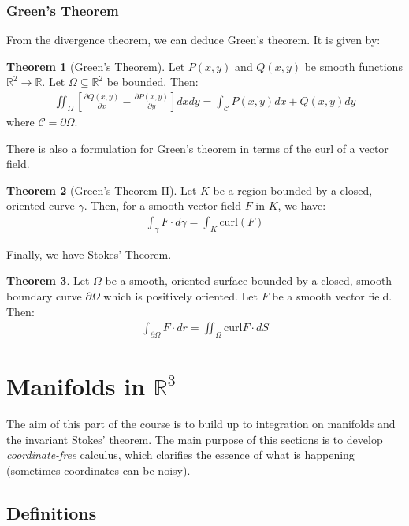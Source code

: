\documentclass[11pt]{scrartcl}
\newcommand{\R}[0]{\mathbb{R}}
\theoremstyle{definition}
\newtheorem{theorem}{Theorem}
\theoremstyle{remark}
\newcommand{\idx}[2]{\int_{#1}^{#2}}
\begin{document}
{\subsubsection{Green's Theorem}
From the divergence theorem, we can deduce Green's theorem. It is given by: 
\begin{theorem}[Green's Theorem]
	Let $P(x,y)$ and $Q(x,y)$ be smooth functions $\R^2 \rightarrow \R$. Let $\Omega \subseteq \R^2$ be bounded. Then: 
	\begin{align}
		\iint_\Omega \left[ 	\frac{\partial Q(x,y)}{\partial x} - \frac{\partial P(x,y)}{\partial y}	\right] dx dy = \idx{\mathcal{C}}{} P(x,y)dx + Q(x,y)dy	
	\end{align}
	where $\mathcal{C} = \partial \Omega$. 
\end{theorem}

There is also a formulation for Green's theorem in terms of the curl of a vector field. 

\begin{theorem}[Green's Theorem II]
	Let $K$ be a region bounded by a closed, oriented curve $\gamma$. Then, for a smooth vector field $F$ in $K$, we have: 
	\begin{align}
		\idx{\gamma}{} F \cdot d \gamma = \idx{K}{} \text{curl}(F) 	
	\end{align}
\end{theorem}

Finally, we have Stokes' Theorem. 

\begin{theorem}
	Let $\Omega$ be a smooth, oriented surface bounded by a closed, smooth boundary curve $\partial \Omega$ which is positively oriented. Let $F$ be a smooth vector field. Then: 
	\begin{align}
		\idx{\partial \Omega}{} F \cdot dr = \iint_{\Omega} \text{curl} F \cdot dS 	
	\end{align}

\end{theorem}

\section{Manifolds in $\R^3$}
The aim of this part of the course is to build up to integration on manifolds and the invariant Stokes' theorem. The main purpose of this sections is to develop \emph{coordinate-free} calculus, which clarifies the essence of what is happening (sometimes coordinates can be noisy). 
\subsection{Definitions}

}
\end{document}
